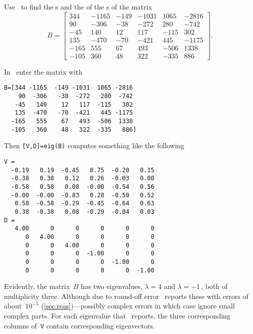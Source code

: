 \begin{example} 
Use \script\ to find the s and the  of the s of the matrix 
\begin{equation*}
B=\begin{bmatrix} 344&-1165&-149&-1031&1065&-2816
\\90&-306&-38&-272&280&-742
\\-45&140&12&117&-115&302
\\135&-470&-70&-421&445&-1175
\\-165&555&67&493&-506&1338
\\-105&360&48&322&-335&886 \end{bmatrix}.
\end{equation*}

\begin{solution} 
In \script\ enter the matrix with
\begin{verbatim}
B=[344 -1165  -149 -1031  1065 -2816
    90  -306   -38  -272   280  -742
   -45   140    12   117  -115   302
   135  -470   -70  -421   445 -1175
  -165   555    67   493  -506  1338
  -105   360    48   322  -335   886]
\end{verbatim}
\setbox\ajrqrbox\hbox{}%
\marginajrbox%
Then \verb|[V,D]=eig(B)| computes something like the following \twodp
\begin{verbatim}
V =
  -0.19   0.19  -0.45   0.75  -0.20   0.15
  -0.38   0.38   0.12   0.26  -0.03   0.00
  -0.58   0.58   0.08  -0.00  -0.54   0.56
  -0.00  -0.00  -0.83   0.28  -0.50   0.52
   0.58  -0.58  -0.29  -0.45  -0.64   0.63
   0.38  -0.38   0.08  -0.29  -0.04   0.03
D =
   4.00      0      0      0      0      0
      0   4.00      0      0      0      0
      0      0   4.00      0      0      0
      0      0      0  -1.00      0      0
      0      0      0      0  -1.00      0
      0      0      0      0      0  -1.00
\end{verbatim}
Evidently, the matrix~\(B\) has two eigenvalues, \(\lambda=4\) and \(\lambda=-1\)\,, both of multiplicity three.
Although due to round-off error \script\ reports these with errors of about~\(10^{-5}\) (\cref{sec:reas})---possibly complex errors in which case ignore small complex parts.
For each eigenvalue that \script\ reports, the three corresponding columns of~\verb|V| contain corresponding eigenvectors.

\end{solution}
\end{example}

